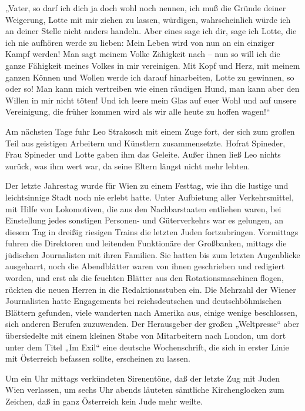 „Vater, so darf ich dich ja doch wohl noch nennen, ich muß die
Gründe deiner Weigerung, Lotte mit mir ziehen zu lassen, würdigen,
wahrscheinlich würde ich an deiner Stelle nicht anders handeln.
Aber eines sage ich dir, sage ich Lotte, die ich nie aufhören werde
zu lieben: Mein Leben wird von nun an ein einziger Kampf werden!
Man sagt meinem Volke Zähigkeit nach – nun so will ich die ganze
Fähigkeit meines Volkes in mir vereinigen. Mit Kopf und Herz, mit
meinem ganzen Können und Wollen werde ich darauf hinarbeiten, Lotte
zu gewinnen, so oder so! Man kann mich vertreiben wie einen
räudigen Hund, man kann aber den Willen in mir nicht töten! Und ich
leere mein Glas auf euer Wohl und auf unsere Vereinigung, die
früher kommen wird als wir alle heute zu hoffen wagen!“

Am nächsten Tage fuhr Leo Strakosch mit einem Zuge fort, der sich
zum großen Teil aus geistigen Arbeitern und Künstlern
zusammensetzte. Hofrat Spineder, Frau Spineder und Lotte gaben ihm
das Geleite. Außer ihnen ließ Leo nichts zurück, was ihm wert war,
da seine Eltern längst nicht mehr lebten.

\tb{* * *}
Der letzte Jahrestag wurde für Wien zu einem
Festtag, wie ihn die lustige und leichtsinnige Stadt noch nie
erlebt hatte. Unter Aufbietung aller Verkehrsmittel, mit Hilfe von
Lokomotiven, die aus den Nachbarstaaten entliehen waren, bei
Einstellung jedes sonstigen Personen- und Güterverkehrs war es
gelungen, an diesem Tag in dreißig riesigen Trains die letzten
Juden fortzubringen. Vormittags fuhren die Direktoren und leitenden
Funktionäre der Großbanken, mittags die jüdischen Journalisten mit
ihren Familien. Sie hatten bis zum letzten Augenblicke ausgeharrt,
noch die Abendblätter waren von ihnen geschrieben und redigiert
worden, und erst als die feuchten Blätter aus den
Rotationsmaschinen flogen, rückten die neuen Herren in die
Redaktionsstuben ein. Die Mehrzahl der Wiener Journalisten hatte
Engagements bei reichsdeutschen und deutschböhmischen Blättern
gefunden, viele wanderten nach Amerika aus, einige wenige
beschlossen, sich anderen Berufen zuzuwenden. Der Herausgeber der
großen „Weltpresse“ aber übersiedelte mit einem kleinen Stabe von
Mitarbeitern nach London, um dort unter dem Titel „Im Exil“ eine
deutsche Wochenschrift, die sich in erster Linie mit Österreich
befassen sollte, erscheinen zu lassen.

Um ein Uhr mittags verkündeten Sirenentöne, daß der letzte Zug mit
Juden Wien verlassen, um sechs Uhr abends läuteten sämtliche
Kirchenglocken zum Zeichen, daß in ganz Österreich kein Jude mehr
weilte.

